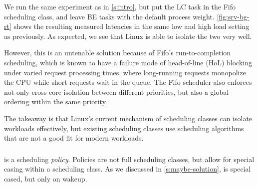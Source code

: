 We run the same experiment as in \autoref{s:intro}, but put the LC task in the
Fifo scheduling class, and leave BE tasks with the default process weight.
\autoref{fig:srv-bg-rt} shows the resulting measured latencies in the same low
and high load setting as previously. As expected, we see that Linux is able to
isolate the two very well. 

However, this is an untenable solution because of Fifo's run-to-completion
scheduling, which is known to have a failure mode of head-of-line (HoL) blocking
under varied request processing times, where long-running requests monopolize
the CPU while short requests wait in the queue. The Fifo scheduler also enforces
not only cross-core isolation between different priorities, but also a global
ordering within the same priority.

The takeaway is that Linux's current mechanism of scheduling classes can isolate
workloads effectively, but existing scheduling classes use scheduling
algorithms that are not a good fit for modern workloads.

\subsubsection{\schedidle}\label{ss:schedidle}

\schedidle{} is a scheduling \textit{policy}. Policies are not full scheduling
classes, but allow for special casing within a scheduling class. As we discussed
in \autoref{s:maybe-solution}, \schedidle{} is special cased, but only on
wakeup.

